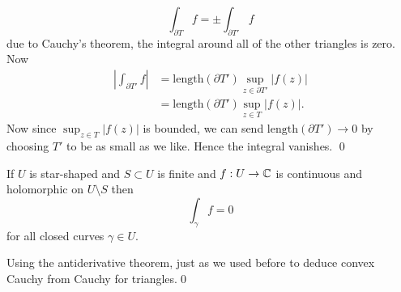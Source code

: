 \documentclass{article}
\begin{document}
\[
	\int_{\partial T} f = \pm \int_{\partial T'} f
\]
due to Cauchy's theorem, the integral around all of the other triangles is zero. Now
\begin{align*}
	\left|\int_{\partial T'} f\right| &= \mathrm{length}(\partial T') \sup_{z\in \partial T'}|f(z)| \\
					  &= \mathrm{length}(\partial T') \sup_{z\in T} |f(z)|.
\end{align*}
Now since $ \sup_{z\in T}|f(z)| $ is bounded, we can send $ \mathrm{length}(\partial T') \to 0 $ by choosing $ T' $ to be as small as we like. Hence the integral vanishes. \qed
\begin{corollary}
  If $ U $ is star-shaped and $ S\subset U $ is finite and $ f:U\to \mathbb{C} $ is continuous and holomorphic on $ U\setminus S $ then
  \[
    \int_\gamma f =0
  \]
  for all closed curves $ \gamma\in U $.
\end{corollary}
\pf Using the antiderivative theorem, just as we used before to deduce convex Cauchy from Cauchy for triangles.\qed
\end{document}
